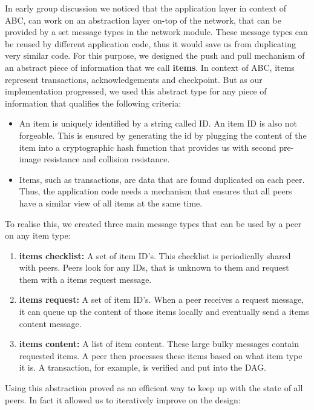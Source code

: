 In early group discussion we noticed that the application layer in context of ABC, can work on an abstraction layer on-top of the network, that can be provided by a set message types in the network module.
These message types can be reused by different application code, thus it would save us from duplicating very similar code. 
For this purpose, we designed the push and pull mechanism of an abstract piece of information that we call \textbf{items}. In context of ABC, items represent transactions, acknowledgements and checkpoint. But as our implementation progressed, we used this abstract type for any piece of information that qualifies the following criteria: 
\begin{itemize}
    \item An item is uniquely identified by a string called ID. An item ID is also not forgeable. This is ensured by generating the id by plugging the content of the item into a cryptographic hash function that provides us with second pre-image resistance and collision resistance.
    \item Items, such as transactions, are data that are found duplicated on each peer. Thus, the application code needs a mechanism that ensures that all peers have a similar view of all items at the same time.
\end{itemize}

To realise this, we created three main message types that can be used by a peer on any item type:

\begin{enumerate}
    \item \textbf{items checklist:} A set of item ID's. This checklist is periodically shared with peers. Peers look for any IDs, that is unknown to them and request them with a items request message.
    \item \textbf{items request:} A set of item ID's. When a peer receives a request message, it can queue up the content of those items locally and eventually send a items content message.
    \item \textbf{items content:} A list of item content. These large bulky messages contain requested items. A peer then processes these items based on what item type it is. A transaction, for example, is verified and put into the DAG.
\end{enumerate}

Using this abstraction proved as an efficient way to keep up with the state of all peers. 
In fact it allowed us to iteratively improve on the design: 

